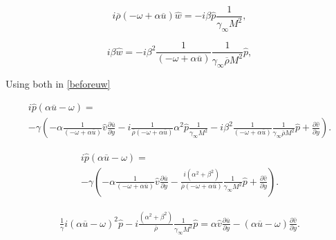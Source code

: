 \begin{equation*} 
i
\overline{\rho}
\left(
-
\omega 
+
\alpha 
\overline{u}
\right)
\hat{w}
=
-
i
\beta\hat{p}
\frac{1}{\gamma_{\infty} M^{2}}
,
\end{equation*} 

\begin{equation*} 
    i
    \beta
\hat{w}
=
-
i
\beta^2
\frac{1}{
\left(-\omega +\alpha \overline{u}
\right)}
\frac{1}{\gamma_{\infty} \overline{\rho}M^{2}}
\hat{p}
,
\end{equation*} 

Using both in \ref{beforeuw}

\begin{equation*} 
    \begin{split}
    i
    \hat{p}
    (
    \alpha
    \overline{u}
    -
    \omega 
    )
=
\\
-
\gamma
\left(
-
\alpha
\frac{1}{
\left(
    -
\omega 
+
\alpha 
\overline{u}
\right)
}
\hat{v}
\frac{\partial\overline{u}}{\partial y}
-
i
\frac{1}{
\overline{\rho}
\left(
-
\omega 
+
\alpha 
\overline{u}
\right)
}
\alpha^2\hat{p}
\frac{1}{\gamma_{\infty} M^{2}}
-
i
\beta^2
\frac{1}{
\left(-\omega +\alpha \overline{u}
\right)}
\frac{1}{\gamma_{\infty} \overline{\rho}M^{2}}
\hat{p}
+
\frac{\partial \hat{v}}{\partial y}
\right)
.
    \end{split}
\end{equation*} 

\begin{equation*} 
    \begin{split}
    i
    \hat{p}
    (
    \alpha
    \overline{u}
    -
    \omega 
    )
=
\\
-
\gamma
\left(
    -
\alpha
\frac{1}{
\left(
-
\omega 
+
\alpha 
\overline{u}
\right)
}
\hat{v}
\frac{\partial\overline{u}}{\partial y}
-
\frac{i(\alpha^2+\beta^2)}{
\overline{\rho}
\left(
    -
\omega 
+
\alpha 
\overline{u}
\right)
}
\frac{1}{\gamma_{\infty} M^{2}}
\hat{p}
+
\frac{\partial \hat{v}}{\partial y}
\right)
.
    \end{split}
\end{equation*} 

\begin{equation*} 
    \begin{split}
    \frac{1}{\gamma}
    i
    (
    \alpha
    \overline{u}
    -
    \omega 
    )^2
    \hat{p}
-
i\frac{(\alpha^2+\beta^2)}{\overline{\rho}}
\frac{1}{\gamma_{\infty} M^{2}}
\hat{p}
=
\alpha
\hat{v}
\frac{\partial\overline{u}}{\partial y}
-
(\alpha\overline{u}-\omega)
\frac{\partial \hat{v}}{\partial y}
.
\end{split}
\end{equation*} 

